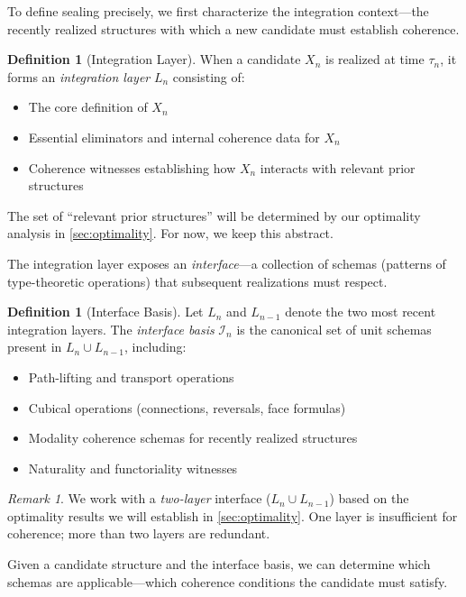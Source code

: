 \documentclass[11pt]{article}
\theoremstyle{definition}
\newtheorem{definition}[theorem]{Definition}
\theoremstyle{remark}
\newtheorem{remark}[theorem]{Remark}
\begin{document}
To define sealing precisely, we first characterize the integration context---the recently realized structures with which a new candidate must establish coherence.

\begin{definition}[Integration Layer]
\label{def:integration-layer}
When a candidate $X_n$ is realized at time $\tau_n$, it forms an \emph{integration layer} $L_n$ consisting of:
\begin{itemize}
\item The core definition of $X_n$
\item Essential eliminators and internal coherence data for $X_n$
\item Coherence witnesses establishing how $X_n$ interacts with relevant prior structures
\end{itemize}
\end{definition}

The set of ``relevant prior structures'' will be determined by our optimality analysis in \cref{sec:optimality}. For now, we keep this abstract.

The integration layer exposes an \emph{interface}---a collection of schemas (patterns of type-theoretic operations) that subsequent realizations must respect.

\begin{definition}[Interface Basis]
\label{def:interface-basis}
Let $L_n$ and $L_{n-1}$ denote the two most recent integration layers. The \emph{interface basis} $\mathcal{I}_n$ is the canonical set of unit schemas present in $L_n \cup L_{n-1}$, including:
\begin{itemize}
\item Path-lifting and transport operations
\item Cubical operations (connections, reversals, face formulas)
\item Modality coherence schemas for recently realized structures
\item Naturality and functoriality witnesses
\end{itemize}
\end{definition}

\begin{remark}
We work with a \emph{two-layer} interface ($L_n \cup L_{n-1}$) based on the optimality results we will establish in \cref{sec:optimality}. One layer is insufficient for coherence; more than two layers are redundant.
\end{remark}

Given a candidate structure and the interface basis, we can determine which schemas are applicable---which coherence conditions the candidate must satisfy.
\end{document}
